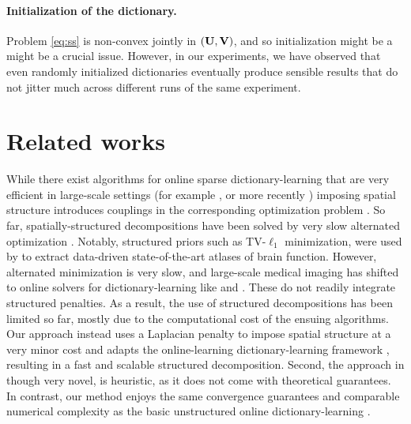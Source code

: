 \paragraph{Initialization of the dictionary.}
Problem \eqref{eq:ss} is non-convex jointly in  $(\mathbf{U}, \mathbf{V})$, and so initialization might be a might be a crucial issue. However, in our experiments, we have observed that even randomly initialized dictionaries eventually produce sensible results that do not jitter much across different runs of the same experiment. %

\section{Related works}
While there exist algorithms for online sparse dictionary-learning
that are very efficient in large-scale settings (for example
 \cite{mairal2010}, or more recently  \cite{mensch2016dictionary})
imposing spatial structure introduces
couplings in the corresponding optimization problem  \cite{dohmatob2014benchmarking}. So far,
spatially-structured decompositions have been solved by very slow
alternated optimization  \cite{varoquaux2011,abraham2013}. Notably,
structured priors such as TV-$\ell_1$  \cite{baldassarre2012} minimization,
were used by  \cite{abraham2013} to extract data-driven
state-of-the-art atlases of brain function.
However, alternated minimization is very slow, and large-scale medical
imaging has shifted to online solvers for
dictionary-learning like  \cite{mairal2010} and  \cite{mensch2016dictionary}.
%
These do not readily
integrate structured penalties. As a result, the use of structured
decompositions has been limited so far, mostly due to the computational
cost of the ensuing algorithms. 
%
Our approach instead uses a Laplacian penalty to impose spatial
structure at a very minor cost and adapts the online-learning
dictionary-learning framework  \cite{mairal2010}, resulting in a fast
and scalable structured decomposition.
%
Second, the approach in  \cite{abraham2013} though very novel, is
heuristic, as it does not come with theoretical guarantees. In contrast, our
method enjoys the same convergence guarantees and comparable numerical
complexity as the basic unstructured online dictionary-learning
 \cite{mairal2010}.

